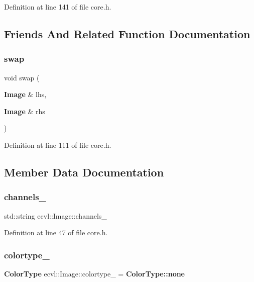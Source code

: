 Definition at line 141 of file core.\+h.



\subsection{Friends And Related Function Documentation}
\mbox{\label{classecvl_1_1_image_a46b938e56fb5d4f394d28839a6979c9e}} 
\subsubsection{swap}
{\footnotesize\ttfamily void swap (\begin{DoxyParamCaption}\item[{\textbf{ Image} \&}]{lhs,  }\item[{\textbf{ Image} \&}]{rhs }\end{DoxyParamCaption})\hspace{0.3cm}{\ttfamily [friend]}}



Definition at line 111 of file core.\+h.



\subsection{Member Data Documentation}
\mbox{\label{classecvl_1_1_image_a3a8898ed7d960538843443c99e49ee34}} 
\subsubsection{channels\_}
{\footnotesize\ttfamily std\+::string ecvl\+::\+Image\+::channels\+\_\+}



Definition at line 47 of file core.\+h.

\mbox{\label{classecvl_1_1_image_a48a690afebe942f779dd1520c61d4d9e}} 
\subsubsection{colortype\_}
{\footnotesize\ttfamily \textbf{ Color\+Type} ecvl\+::\+Image\+::colortype\+\_\+ = \textbf{ Color\+Type\+::none}}



